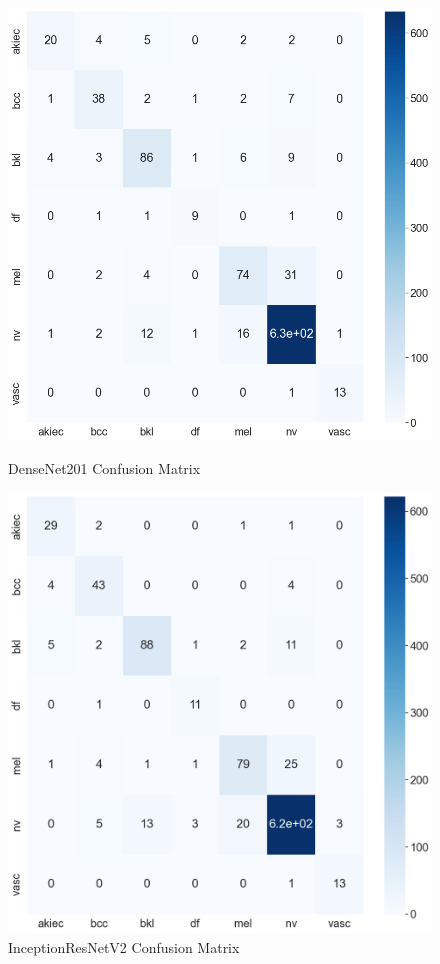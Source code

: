 \documentclass[sensors,article,submit,pdftex,moreauthors]{Definitions/mdpi}
\begin{document}
\begin{figure}[!htb]
	\begin{minipage}{0.48\textwidth}
		\centering
		\includegraphics[width=1\linewidth]{Definitions/CM/dn201cm}
		\caption{DenseNet201 Confusion Matrix}\label{fig:densenet201cm}
	\end{minipage}\hfill
	\begin{minipage}{0.48\textwidth}
		\centering
		\includegraphics[width=1\linewidth]{Definitions/CM/irv2cm}
		\caption{InceptionResNetV2 Confusion Matrix}\label{fig:irv2cm}
	\end{minipage}
\end{figure}
\end{document}

